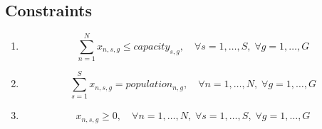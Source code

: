 \documentclass{article}
\begin{document}
\subsection*{Constraints}
\begin{enumerate}
    \item {}
    \[
    \sum_{n=1}^{N} x_{n,s,g} \leq capacity_{s,g}, \quad \forall s = 1, \ldots, S, \; \forall g = 1, \ldots, G
    \]
    
    \item {}
    \[
    \sum_{s=1}^{S} x_{n,s,g} = population_{n,g}, \quad \forall n = 1, \ldots, N, \; \forall g = 1, \ldots, G
    \]

    \item {}
    \[
    x_{n,s,g} \geq 0, \quad \forall n = 1, \ldots, N, \; \forall s = 1, \ldots, S, \; \forall g = 1, \ldots, G
    \]
\end{enumerate}
\end{document}
